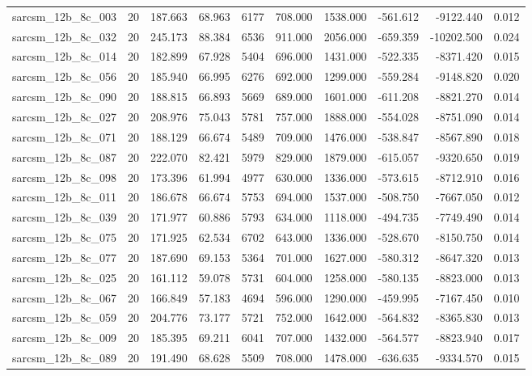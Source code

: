 \begin{tabular}{lrrrrrrrrr}
sarcsm\_12b\_8c\_003 & 20 & 187.663 & 68.963 & 6177 & 708.000 & 1538.000 & -561.612 & -9122.440 & 0.012 \\
sarcsm\_12b\_8c\_032 & 20 & 245.173 & 88.384 & 6536 & 911.000 & 2056.000 & -659.359 & -10202.500 & 0.024 \\
sarcsm\_12b\_8c\_014 & 20 & 182.899 & 67.928 & 5404 & 696.000 & 1431.000 & -522.335 & -8371.420 & 0.015 \\
sarcsm\_12b\_8c\_056 & 20 & 185.940 & 66.995 & 6276 & 692.000 & 1299.000 & -559.284 & -9148.820 & 0.020 \\
sarcsm\_12b\_8c\_090 & 20 & 188.815 & 66.893 & 5669 & 689.000 & 1601.000 & -611.208 & -8821.270 & 0.014 \\
sarcsm\_12b\_8c\_027 & 20 & 208.976 & 75.043 & 5781 & 757.000 & 1888.000 & -554.028 & -8751.090 & 0.014 \\
sarcsm\_12b\_8c\_071 & 20 & 188.129 & 66.674 & 5489 & 709.000 & 1476.000 & -538.847 & -8567.890 & 0.018 \\
sarcsm\_12b\_8c\_087 & 20 & 222.070 & 82.421 & 5979 & 829.000 & 1879.000 & -615.057 & -9320.650 & 0.019 \\
sarcsm\_12b\_8c\_098 & 20 & 173.396 & 61.994 & 4977 & 630.000 & 1336.000 & -573.615 & -8712.910 & 0.016 \\
sarcsm\_12b\_8c\_011 & 20 & 186.678 & 66.674 & 5753 & 694.000 & 1537.000 & -508.750 & -7667.050 & 0.012 \\
sarcsm\_12b\_8c\_039 & 20 & 171.977 & 60.886 & 5793 & 634.000 & 1118.000 & -494.735 & -7749.490 & 0.014 \\
sarcsm\_12b\_8c\_075 & 20 & 171.925 & 62.534 & 6702 & 643.000 & 1336.000 & -528.670 & -8150.750 & 0.014 \\
sarcsm\_12b\_8c\_077 & 20 & 187.690 & 69.153 & 5364 & 701.000 & 1627.000 & -580.312 & -8647.320 & 0.013 \\
sarcsm\_12b\_8c\_025 & 20 & 161.112 & 59.078 & 5731 & 604.000 & 1258.000 & -580.135 & -8823.000 & 0.013 \\
sarcsm\_12b\_8c\_067 & 20 & 166.849 & 57.183 & 4694 & 596.000 & 1290.000 & -459.995 & -7167.450 & 0.010 \\
sarcsm\_12b\_8c\_059 & 20 & 204.776 & 73.177 & 5721 & 752.000 & 1642.000 & -564.832 & -8365.830 & 0.013 \\
sarcsm\_12b\_8c\_009 & 20 & 185.395 & 69.211 & 6041 & 707.000 & 1432.000 & -564.577 & -8823.940 & 0.017 \\
sarcsm\_12b\_8c\_089 & 20 & 191.490 & 68.628 & 5509 & 708.000 & 1478.000 & -636.635 & -9334.570 & 0.015 \\

\end{tabular}
